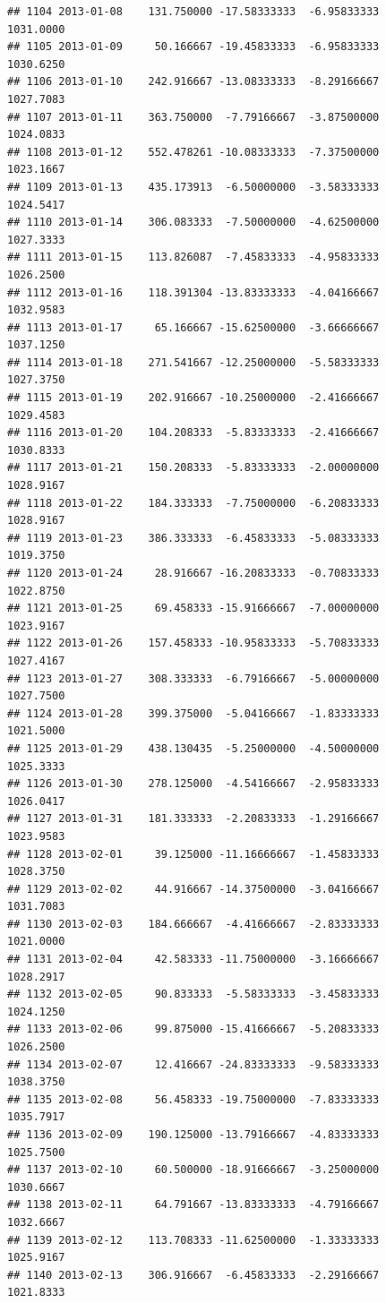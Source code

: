 \documentclass[
]{article}
\begin{document}
\begin{verbatim}
## 1104 2013-01-08    131.750000 -17.58333333  -6.95833333    1031.0000
## 1105 2013-01-09     50.166667 -19.45833333  -6.95833333    1030.6250
## 1106 2013-01-10    242.916667 -13.08333333  -8.29166667    1027.7083
## 1107 2013-01-11    363.750000  -7.79166667  -3.87500000    1024.0833
## 1108 2013-01-12    552.478261 -10.08333333  -7.37500000    1023.1667
## 1109 2013-01-13    435.173913  -6.50000000  -3.58333333    1024.5417
## 1110 2013-01-14    306.083333  -7.50000000  -4.62500000    1027.3333
## 1111 2013-01-15    113.826087  -7.45833333  -4.95833333    1026.2500
## 1112 2013-01-16    118.391304 -13.83333333  -4.04166667    1032.9583
## 1113 2013-01-17     65.166667 -15.62500000  -3.66666667    1037.1250
## 1114 2013-01-18    271.541667 -12.25000000  -5.58333333    1027.3750
## 1115 2013-01-19    202.916667 -10.25000000  -2.41666667    1029.4583
## 1116 2013-01-20    104.208333  -5.83333333  -2.41666667    1030.8333
## 1117 2013-01-21    150.208333  -5.83333333  -2.00000000    1028.9167
## 1118 2013-01-22    184.333333  -7.75000000  -6.20833333    1028.9167
## 1119 2013-01-23    386.333333  -6.45833333  -5.08333333    1019.3750
## 1120 2013-01-24     28.916667 -16.20833333  -0.70833333    1022.8750
## 1121 2013-01-25     69.458333 -15.91666667  -7.00000000    1023.9167
## 1122 2013-01-26    157.458333 -10.95833333  -5.70833333    1027.4167
## 1123 2013-01-27    308.333333  -6.79166667  -5.00000000    1027.7500
## 1124 2013-01-28    399.375000  -5.04166667  -1.83333333    1021.5000
## 1125 2013-01-29    438.130435  -5.25000000  -4.50000000    1025.3333
## 1126 2013-01-30    278.125000  -4.54166667  -2.95833333    1026.0417
## 1127 2013-01-31    181.333333  -2.20833333  -1.29166667    1023.9583
## 1128 2013-02-01     39.125000 -11.16666667  -1.45833333    1028.3750
## 1129 2013-02-02     44.916667 -14.37500000  -3.04166667    1031.7083
## 1130 2013-02-03    184.666667  -4.41666667  -2.83333333    1021.0000
## 1131 2013-02-04     42.583333 -11.75000000  -3.16666667    1028.2917
## 1132 2013-02-05     90.833333  -5.58333333  -3.45833333    1024.1250
## 1133 2013-02-06     99.875000 -15.41666667  -5.20833333    1026.2500
## 1134 2013-02-07     12.416667 -24.83333333  -9.58333333    1038.3750
## 1135 2013-02-08     56.458333 -19.75000000  -7.83333333    1035.7917
## 1136 2013-02-09    190.125000 -13.79166667  -4.83333333    1025.7500
## 1137 2013-02-10     60.500000 -18.91666667  -3.25000000    1030.6667
## 1138 2013-02-11     64.791667 -13.83333333  -4.79166667    1032.6667
## 1139 2013-02-12    113.708333 -11.62500000  -1.33333333    1025.9167
## 1140 2013-02-13    306.916667  -6.45833333  -2.29166667    1021.8333

\end{verbatim}
\end{document}
